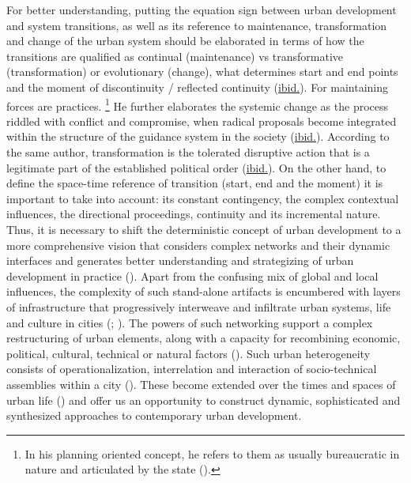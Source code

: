 \documentclass[11pt]{report}
\begin{document}
For better understanding, putting the equation sign between urban development and system transitions, as well as its reference to maintenance, transformation and change of the urban system should be elaborated in terms of how the transitions are qualified as continual (maintenance) vs transformative (transformation) or evolutionary (change), what determines start and end points and the moment of discontinuity / reflected continuity (\href{Nedovic}{ibid.}).
For \href{Friedmann}{\citealt{friedmann_planning_1987}} maintaining forces are practices.
\footnote{In his planning oriented concept, he refers to them as usually bureaucratic in nature and articulated by the state (\href{Friedmann}{\citealt{friedmann_planning_1987}}).}
He further elaborates the systemic change as the process riddled with conflict and compromise, when radical proposals become integrated within the structure of the guidance system in the society (\href{Friedmann}{ibid.}).
According to the same author, transformation is the tolerated disruptive action that is a legitimate part of the established political order (\href{Friedmann}{ibid.}).
On the other hand, to define the space-time reference of transition (start, end and the moment) it is important to take into account: its constant contingency, the complex contextual influences, the directional proceedings, continuity and its incremental nature.
\\    

Thus, it is necessary to shift the deterministic concept of urban development to a more comprehensive vision that considers complex networks and their dynamic interfaces and generates better understanding and strategizing of urban development in practice (\href{Huang}{\citealt{huang_ict-oriented_2012}}).
Apart from the confusing mix of global and local influences, the complexity of such stand-alone artifacts is encumbered with layers of infrastructure that progressively interweave and infiltrate urban systems, life and culture in cities (\href{Graham}{\citealt{graham_end_1998}}; \href{Portugali}{\citealt{Portugali2011}}).
The powers of such networking support a complex restructuring of urban elements, along with a capacity for recombining economic, political, cultural, technical or natural factors (\href{Murdoch}{\citealt{murdoch_spaces_1998}}).
Such urban heterogeneity consists of operationalization, interrelation and interaction of socio-technical assemblies within a city (\href{Graham}{\citealt{graham_splintering_2001}}).
These become extended over the times and spaces of urban life (\href{Mitchell}{\citealt{mitchell_city_1996}}) and offer us an opportunity to construct dynamic, sophisticated and synthesized approaches to contemporary urban development.
\\
\end{document}
